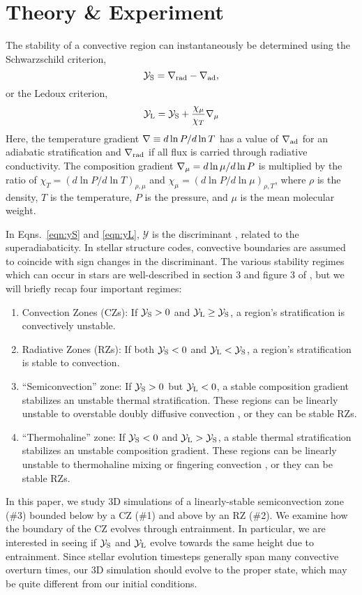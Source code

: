 \section{Theory \& Experiment}
\label{sec:theory}
The stability of a convective region can instantaneously be determined using the Schwarzschild criterion,
\begin{equation}
    \yS = \gradrad - \gradad,
    \label{eqn:yS}
\end{equation}
or the Ledoux criterion,
\begin{equation}
    \yL = \yS +  \frac{\chi_\mu}{\chi_T}\gradmu
    \label{eqn:yL}
\end{equation}
Here, the temperature gradient $\nabla \equiv d \ln P / d \ln T$ has a value of $\nabla_{\rm{ad}}$ for an adiabatic stratification and $\nabla_{\rm{rad}}$ if all flux is carried through radiative conductivity.
The composition gradient $\nabla_{\mu} = d\ln\mu/d\ln P$ is multiplied by the ratio of $\chi_T = (d\ln P / d\ln T)_{\rho,\mu}$ and $\chi_\mu = (d\ln P / d\ln\mu)_{\rho,T}$, where $\rho$ is the density, $T$ is the temperature, $P$ is the pressure, and $\mu$ is the mean molecular weight.

In Eqns.~\ref{eqn:yS} and \ref{eqn:yL}, $\mathcal{Y}$ is the discriminant \citep[e.g.,][sec.~2]{mesa4}, related to the superadiabaticity.
In stellar structure codes, convective boundaries are assumed to coincide with sign changes in the discriminant.
The various stability regimes which can occur in stars are well-described in section 3 and figure 3 of \citet{salaris_cassisi_2017}, but we will briefly recap four important regimes:
\begin{enumerate}
    \item Convection Zones (CZs): If $\mathcal{Y}_{\rm{S}} > 0$ and $\mathcal{Y}_{\rm{L}} \geq \mathcal{Y}_{\rm{S}}$, a region's stratification is convectively unstable.
    \item Radiative Zones (RZs): If both $\mathcal{Y}_{\rm{S}} < 0$ and $\mathcal{Y}_{\rm{L}} < \mathcal{Y}_{\rm{S}}$, a region's stratification is stable to convection.
    \item ``Semiconvection'' zone: If $\mathcal{Y}_{\rm{S}} > 0$ but $\mathcal{Y}_{\rm{L}} < 0$, a stable composition gradient stabilizes an unstable thermal stratification.
        These regions can be linearly unstable to overstable doubly diffusive convection \citep[ODDC, see][chapter 2]{garaud_2018}, or they can be stable RZs.
    \item ``Thermohaline'' zone: If $\mathcal{Y}_{\rm{S}} < 0$ and $\mathcal{Y}_{\rm{L}} > \mathcal{Y}_{\rm{S}}$, a stable thermal stratification stabilizes an unstable composition gradient.
        These regions can be linearly unstable to thermohaline mixing or fingering convection \citep[see][chapter 3]{garaud_2018}, or they can be stable RZs.
\end{enumerate}
In this paper, we study 3D simulations of a linearly-stable semiconvection zone (\#3) bounded below by a CZ (\#1) and above by an RZ (\#2).
We examine how the boundary of the CZ evolves through entrainment.
In particular, we are interested in seeing if $\mathcal{Y}_{\rm{S}}$ and $\mathcal{Y}_{\rm{L}}$ evolve towards the same height due to entrainment.
Since stellar evolution timesteps generally span many convective overturn times, our 3D simulation should evolve to the proper state, which may be quite different from our initial conditions.

